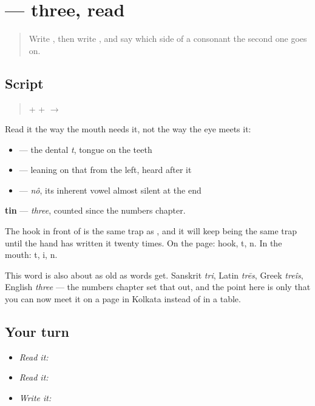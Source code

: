 \section[tin]{ — three, read}

\label{lesson:BN-W02-tin-read}



\begin{quote}
Write \textbf{}, then write \textbf{}, and say which side of a consonant the second one goes on.
\end{quote}

\subsection*{Script}
\begin{quote}
\textbf{} + \textbf{} + \textbf{} $\to$ \textbf{}
\end{quote}

Read it the way the mouth needs it, not the way the eye meets it:

\begin{itemize}
\raggedright
  \item \textbf{} — the dental \emph{t}, tongue on the teeth
  \item \textbf{} — leaning on that \textbf{} from the left, heard after it
  \item \textbf{} — \emph{nô}, its inherent vowel almost silent at the end
\end{itemize}

\textbf{tin} — \emph{three}, counted since the numbers chapter.

The hook in front of \textbf{} is the same trap as \textbf{}, and it will keep being the same trap until the hand has written it twenty times. On the page: hook, t, n. In the mouth: t, i, n.

This word is also about as old as words get. Sanskrit \emph{tri}, Latin \emph{trēs}, Greek \emph{treîs}, English \emph{three} — the numbers chapter set that out, and the point here is only that you can now meet it on a page in Kolkata instead of in a table.

\subsection*{Your turn}
\begin{itemize}
\raggedright
  \item \emph{Read it:} 
  \item \emph{Read it:} 
  \item \emph{Write it:} 
\end{itemize}

